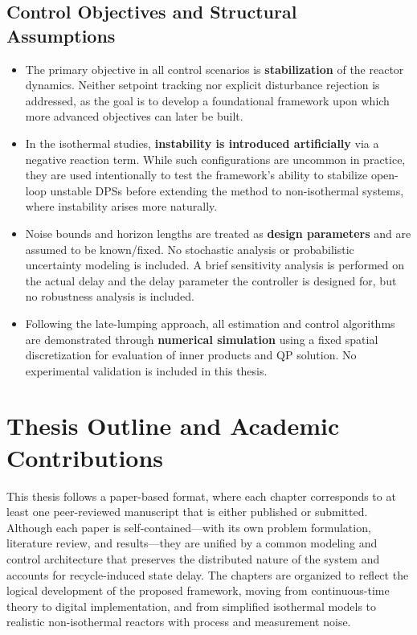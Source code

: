 \subsection*{Control Objectives and Structural Assumptions}

\begin{itemize}
    \item The primary objective in all control scenarios is \textbf{stabilization} of the reactor dynamics. Neither setpoint tracking nor explicit disturbance rejection is addressed, as the goal is to develop a foundational framework upon which more advanced objectives can later be built.

    \item In the isothermal studies, \textbf{instability is introduced artificially} via a negative reaction term. While such configurations are uncommon in practice, they are used intentionally to test the framework’s ability to stabilize open-loop unstable DPSs before extending the method to non-isothermal systems, where instability arises more naturally.

    \item Noise bounds and horizon lengths are treated as \textbf{design parameters} and are assumed to be known/fixed. No stochastic analysis or probabilistic uncertainty modeling is included. A brief sensitivity analysis is performed on the actual delay and the delay parameter the controller is designed for, but no robustness analysis is included.

    \item Following the late-lumping approach, all estimation and control algorithms are demonstrated through \textbf{numerical simulation} using a fixed spatial discretization for evaluation of inner products and QP solution. No experimental validation is included in this thesis.
\end{itemize}


\section{Thesis Outline and Academic Contributions}

This thesis follows a paper-based format, where each chapter corresponds to at least one peer-reviewed manuscript that is either published or submitted. Although each paper is self-contained—with its own problem formulation, literature review, and results—they are unified by a common modeling and control architecture that preserves the distributed nature of the system and accounts for recycle-induced state delay. The chapters are organized to reflect the logical development of the proposed framework, moving from continuous-time theory to digital implementation, and from simplified isothermal models to realistic non-isothermal reactors with process and measurement noise.

